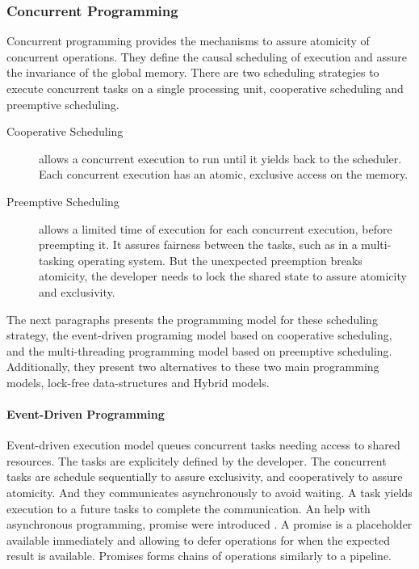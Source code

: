\subsubsection{Concurrent Programming} \label{chapter3:software-efficiency:concurrency:concurrent-programming}


Concurrent programming provides the mechanisms to assure atomicity of concurrent operations.
They define the causal scheduling of execution and assure the invariance of the global memory.
There are two scheduling strategies to execute concurrent tasks on a single processing unit, cooperative scheduling and preemptive scheduling.

\begin{description}
\item[Cooperative Scheduling] allows a concurrent execution to run until it yields back to the scheduler.
Each concurrent execution has an atomic, exclusive access on the memory.
\item[Preemptive Scheduling] allows a limited time of execution for each concurrent execution, before preempting it.
It assures fairness between the tasks, such as in a multi-tasking operating system.
But the unexpected preemption breaks atomicity, the developer needs to lock the shared state to assure atomicity and exclusivity.
\end{description}

The next paragraphs presents the programming model for these scheduling strategy, the event-driven programing model based on cooperative scheduling, and the multi-threading programming model based on preemptive scheduling.
Additionally, they present two alternatives to these two main programming models, lock-free data-structures and Hybrid models.

\paragraph{Event-Driven Programming}

Event-driven execution model queues concurrent tasks needing access to shared resources.
The tasks are explicitely defined by the developer.
The concurrent tasks are schedule sequentially to assure exclusivity, and cooperatively to assure atomicity.
And they communicates asynchronously to avoid waiting.
A task yields execution to a future tasks to complete the communication.
An help with asynchronous programming, promise were introduced \cite{Liskov1988}.
A promise is a placeholder available immediately and allowing to defer operations for when the expected result is available.
Promises forms chains of operations similarly to a pipeline.

